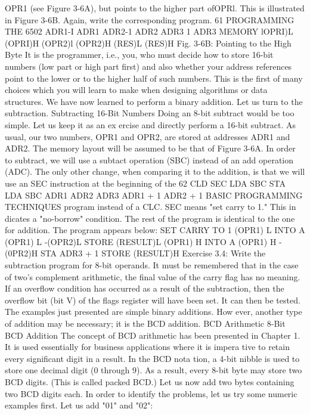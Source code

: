 OPR1 (see Figure 3-6A), but points to the higher part ofOPRl. This is
illustrated in Figure 3-6B. Again, write the corresponding program.
61
PROGRAMMING THE 6502
ADR1-I
ADR1
ADR2-1
ADR2
ADR3 1
ADR3
MEMORY
lOPRI)L
(OPRI)H
(OPR2)l
(OPR2)H
(RES)L
(RES)H
Fig. 3-6B: Pointing to the High Byte
It is the programmer, i.e., you, who must decide how to store 16-bit
numbers (low part or high part first) and also whether your address
references point to the lower or to the higher half of such numbers.
This is the first of many choices which you will learn to make when
designing algorithms or data structures.
We have now learned to perform a binary addition. Let us turn
to the subtraction.
Subtracting 16-Bit Numbers
Doing an 8-bit subtract would be too simple. Let us keep it as an ex
ercise and directly perform a 16-bit subtract. As usual, our two
numbers, OPR1 and OPR2, are stored at addresses ADR1 and ADR2.
The memory layout will be assumed to be that of Figure 3-6A. In order
to subtract, we will use a subtact operation (SBC) instead of an add
operation (ADC). The only other change, when comparing it to the
addition, is that we will use an SEC instruction at the beginning of the
62
CLD
SEC
LDA
SBC
STA
LDA
SBC
ADR1
ADR2
ADR3
ADR1 + 1
ADR2 + 1
BASIC PROGRAMMING TECHNIQUES
program instead of a CLC. SEC means "set carry to 1." This in
dicates a "no-borrow" condition. The rest of the program is identical
to the one for addition. The program appears below:
SET CARRY TO 1
(OPR1) L INTO A
(OPR1) L -(OPR2)L
STORE (RESULT)L
(OPR1) H INTO A
(OPR1) H -(0PR2)H
STA ADR3 + 1 STORE (RESULT)H
Exercise 3.4: Write the subtraction program for 8-bit operands.
It must be remembered that in the case of two's complement
arithmetic, the final value of the carry flag has no meaning. If an
overflow condition has occurred as a result of the subtraction,
then the overflow bit (bit V) of the flags register will have been
set. It can then be tested.
The examples just presented are simple binary additions. How
ever, another type of addition may be necessary; it is the BCD
addition.
BCD Arithmetic
8-Bit BCD Addition
The concept of BCD arithmetic has been presented in Chapter 1.
It is used essentially for business applications where it is impera
tive to retain every significant digit in a result. In the BCD nota
tion, a 4-bit nibble is used to store one decimal digit (0 through 9).
As a result, every 8-bit byte may store two BCD digits. (This is
called packed BCD.) Let us now add two bytes containing two
BCD digits each.
In order to identify the problems, let us try some numeric
examples first.
Let us add "01" and "02":

